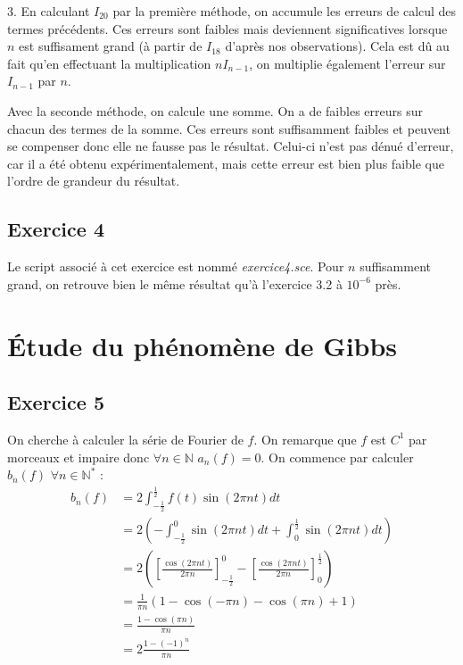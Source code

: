 \documentclass[a4paper,11pt]{article}
\begin{document}
	3. En calculant $I_{20}$ par la première méthode, on accumule les erreurs de calcul des termes précédents. Ces erreurs sont faibles mais deviennent significatives lorsque $n$ est suffisament grand (à partir de $I_{18}$ d'après nos observations). Cela est dû au fait qu'en effectuant la multiplication $nI_{n-1}$, on multiplie également l'erreur sur $I_{n-1}$ par $n$.
	
	Avec la seconde méthode, on calcule une somme. On a de faibles erreurs sur chacun des termes de la somme. Ces erreurs sont suffisamment faibles et peuvent se compenser donc elle ne fausse pas le résultat. Celui-ci n'est pas dénué d'erreur, car il a été obtenu expérimentalement, mais cette erreur est bien plus faible que l'ordre de grandeur du résultat.

\subsection*{Exercice 4}
	Le script associé à cet exercice est nommé \textit{exercice4.sce}. Pour $n$ suffisamment grand, on retrouve bien le même résultat qu'à l'exercice 3.2 à $10^{-6}$ près.


\section{Étude du phénomène de Gibbs}

\subsection*{Exercice 5}
	On cherche à calculer la série de Fourier de $f$. On remarque que $f$ est $C^{1}$ par morceaux et impaire donc $\forall n \in \mathbb{N} $ $a_{n}(f) = 0$.
	On commence par calculer $b_{n}(f)$ $\forall n \in \mathbb{N}^{*}$ :
	\begin{align*}
		b_{n}(f)
		& = 2 \int_{-\frac{1}{2}}^{\frac{1}{2}} f(t) \sin (2 \pi n t) dt \\
		& = 2 \left ( - \int_{-\frac{1}{2}}^{0} \sin (2 \pi n t) dt + \int_{0}^{\frac{1}{2}} \sin (2 \pi n t) dt \right ) \\
		& = 2 \left ( \left [ \frac{\cos ( 2 \pi n t)}{2 \pi n} \right ]_{-\frac{1}{2}}^{0} - \left [ \frac{\cos ( 2 \pi n t)}{2 \pi n} \right ]_{0}^{\frac{1}{2}} \right ) \\
		& = \frac{1}{\pi n} \left ( 1 - \cos (- \pi n) - \cos ( \pi n) + 1 \right ) \\
		& = \frac{1 - \cos (\pi n)}{\pi n} \\
		& = 2 \frac{1-(-1)^{n}}{\pi n}
	\end{align*}
\end{document}
